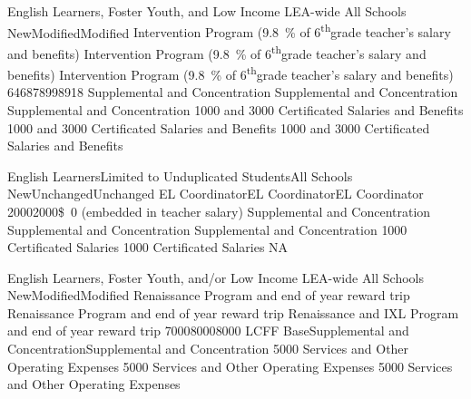 \documentclass{article}
\renewcommand{\th}{\textsuperscript{th}}
\newcommand{\dollar}[1]{\SI{#1}[\$]{}}
\newcounter{goal}[section] %
\newcounter{action}[goal]
\begin{document}
\begin{planactions}
	\planaction@scope
	{English Learners, Foster Youth, and Low Income}
	{LEA-wide}
	{All Schools}
	\planaction@action
	{New}{Modified}{Modified}
	{Intervention Program (\SI{9.8}{\percent} of 6\th grade teacher's salary and benefits)}
	{Intervention Program (\SI{9.8}{\percent} of 6\th grade teacher's salary and benefits)}
	{Intervention Program (\SI{9.8}{\percent} of 6\th grade teacher's salary and benefits)}
	\planaction@budget
	{6468}{7899}{8918}
	{Supplemental and Concentration}
	{Supplemental and Concentration}
	{Supplemental and Concentration}
	{\num{1000} and \num{3000} Certificated Salaries and Benefits}
	{\num{1000} and \num{3000} Certificated Salaries and Benefits}
	{\num{1000} and \num{3000} Certificated Salaries and Benefits}

	\planaction@scope
	{English Learners}{Limited to Unduplicated Students}{All Schools}
	\planaction@action
	{New}{Unchanged}{Unchanged}
	{EL Coordinator}{EL Coordinator}{EL Coordinator}
	\planaction@budget
	{2000}{2000}{\dollar{0} (embedded in teacher salary)}
	{Supplemental and Concentration}
	{Supplemental and Concentration}
	{Supplemental and Concentration}
	{\num{1000} Certificated Salaries}
	{\num{1000} Certificated Salaries}
	{NA}

	\planaction@scope
	{English Learners, Foster Youth, and/or Low Income}
	{LEA-wide}
	{All Schools}
	\planaction@action
	{New}{Modified}{Modified}
	{Renaissance Program and end of year reward trip}
	{Renaissance Program and end of year reward trip}
	{Renaissance and IXL Program and end of year reward trip}
	\planaction@budget
	{7000}{8000}{8000}
	{LCFF Base}{Supplemental and Concentration}{Supplemental and Concentration}
	{\num{5000} Services and Other Operating Expenses}
	{\num{5000} Services and Other Operating Expenses}
	{\num{5000} Services and Other Operating Expenses}


\end{planactions}
\end{document}
